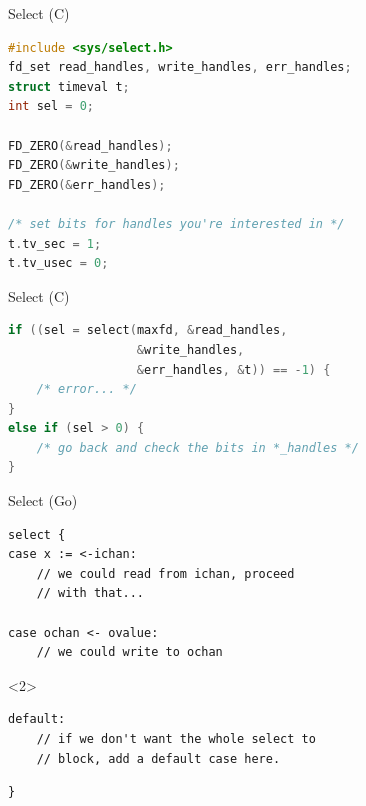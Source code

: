 \documentclass[pdf,t]{beamer}
\begin{document}
\begin{frame}[fragile]{Select (C)}
\begin{lstlisting}[language=c]
#include <sys/select.h>
fd_set read_handles, write_handles, err_handles;
struct timeval t;
int sel = 0;

FD_ZERO(&read_handles);
FD_ZERO(&write_handles);
FD_ZERO(&err_handles);

/* set bits for handles you're interested in */
t.tv_sec = 1;
t.tv_usec = 0;
\end{lstlisting}
\end{frame}
\begin{frame}[fragile]{Select (C)}
\begin{lstlisting}[language=c]
if ((sel = select(maxfd, &read_handles, 
                  &write_handles, 
                  &err_handles, &t)) == -1) {
    /* error... */
}
else if (sel > 0) {
    /* go back and check the bits in *_handles */
}
\end{lstlisting}
\end{frame}
\begin{frame}[fragile]{Select (Go)}
\begin{lstlisting}
select {
case x := <-ichan:
    // we could read from ichan, proceed
    // with that...

case ochan <- ovalue:
    // we could write to ochan
\end{lstlisting}
\begin{onlyenv}<2>
\begin{lstlisting}
default:
    // if we don't want the whole select to
    // block, add a default case here.
\end{lstlisting}
\end{onlyenv}
\begin{lstlisting}
}
\end{lstlisting}
\end{frame}
\end{document}
